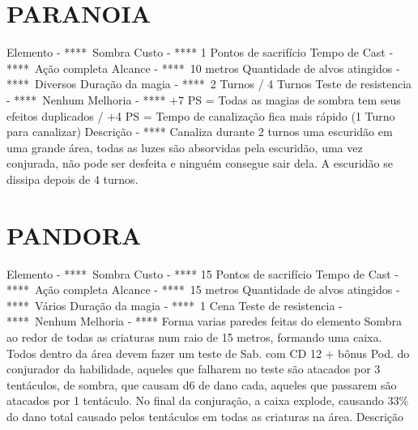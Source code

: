 \documentclass{article}%
\begin{document}
\section{PARANOIA}%
\label{sec:PARANOIA}%
Elemento {-} ****~Sombra\newline%
Custo {-} **** 1 Pontos de sacrifício\newline%
Tempo de Cast {-} ****~Ação completa\newline%
Alcance {-} ****~10 metros\newline%
Quantidade de alvos atingidos {-} ****~Diversos\newline%
Duração da magia {-} ****~2 Turnos / 4 Turnos\newline%
Teste de resistencia {-} ****~Nenhum\newline%
Melhoria {-} **** +7 PS = Todas as magias de sombra tem seus efeitos duplicados / +4 PS = Tempo de canalização fica mais rápido (1 Turno para canalizar)\newline%
Descrição {-} **** Canaliza durante 2 turnos uma escuridão em uma grande área, todas as luzes são absorvidas pela escuridão, uma vez conjurada, não pode ser desfeita e ninguém consegue sair dela. A escuridão se dissipa depois de 4 turnos.\newline%

%
\section{PANDORA}%
\label{sec:PANDORA}%
Elemento {-} ****~Sombra\newline%
Custo {-} **** 15 Pontos de sacrifício\newline%
Tempo de Cast {-} ****~Ação completa\newline%
Alcance {-} ****~15 metros\newline%
Quantidade de alvos atingidos {-} ****~Vários\newline%
Duração da magia {-} ****~1 Cena\newline%
Teste de resistencia {-} ****~Nenhum\newline%
Melhoria {-} **** Forma varias paredes feitas do elemento Sombra ao redor de todas as criaturas num raio de 15 metros, formando uma caixa. Todos dentro da área devem fazer um teste de Sab. com CD 12 + bônus Pod. do conjurador da habilidade, aqueles que falharem no teste são atacados por 3 tentáculos, de sombra, que causam d6 de dano cada, aqueles que passarem são atacados por 1 tentáculo. No final da conjuração, a caixa explode, causando 33\% do dano total causado pelos tentáculos em todas as criaturas na área.\newline%
Descrição \newline%
\end{document}
